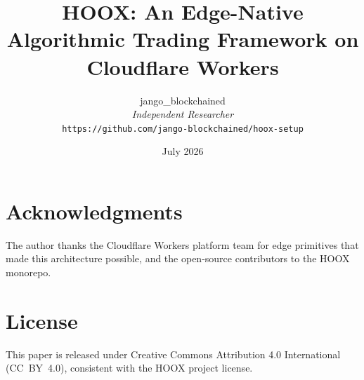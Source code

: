 \documentclass[10pt,a4paper]{article}
\title{\textbf{HOOX: An Edge-Native Algorithmic Trading Framework on Cloudflare Workers}}
\author{
  jango\_blockchained \\
  \small\textit{Independent Researcher} \\
  \small\texttt{https://github.com/jango-blockchained/hoox-setup}
}
\date{July 2026}
\begin{document}
\maketitle














\section*{Acknowledgments}

The author thanks the Cloudflare Workers platform team for edge primitives that made this architecture possible, and the open-source contributors to the \textsc{HOOX} monorepo.

\section*{License}

This paper is released under Creative Commons Attribution 4.0 International (CC~BY~4.0), consistent with the \textsc{HOOX} project license.




\appendix




\end{document}
